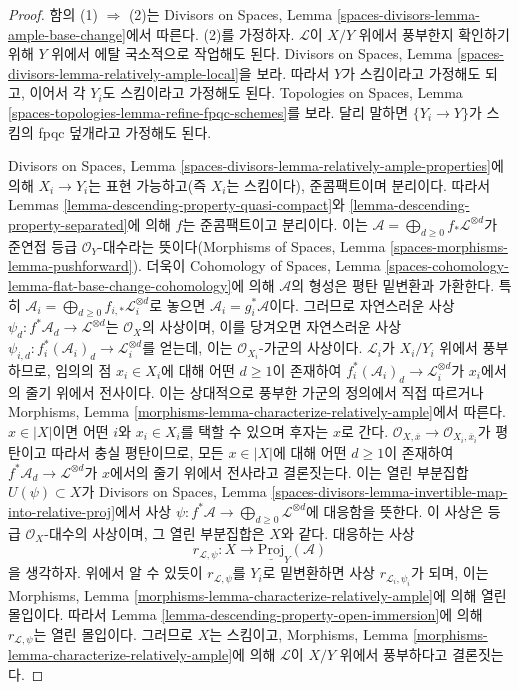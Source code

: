 \begin{proof}
함의 (1) $\Rightarrow$ (2)는 Divisors on Spaces, Lemma
\ref{spaces-divisors-lemma-ample-base-change}에서 따른다. (2)를 가정하자.
$\mathcal{L}$이 $X/Y$ 위에서 풍부한지 확인하기 위해 $Y$ 위에서 에탈
국소적으로 작업해도 된다. Divisors on Spaces, Lemma
\ref{spaces-divisors-lemma-relatively-ample-local}을 보라. 따라서 $Y$가
스킴이라고 가정해도 되고, 이어서 각 $Y_i$도 스킴이라고 가정해도 된다.
Topologies on Spaces, Lemma
\ref{spaces-topologies-lemma-refine-fpqc-schemes}를 보라. 달리 말하면
$\{Y_i\to Y\}$가 스킴의 fpqc 덮개라고 가정해도 된다.

\medskip\noindent
Divisors on Spaces, Lemma
\ref{spaces-divisors-lemma-relatively-ample-properties}에 의해
$X_i\to Y_i$는 표현 가능하고(즉 $X_i$는 스킴이다), 준콤팩트이며
분리이다. 따라서 Lemmas \ref{lemma-descending-property-quasi-compact}와
\ref{lemma-descending-property-separated}에 의해 $f$는 준콤팩트이고
분리이다. 이는
$\mathcal{A}=\bigoplus_{d\geq 0}f_*\mathcal{L}^{\otimes d}$가 준연접
등급 $\mathcal{O}_Y$-대수라는 뜻이다(Morphisms of Spaces, Lemma
\ref{spaces-morphisms-lemma-pushforward}). 더욱이 Cohomology of Spaces,
Lemma \ref{spaces-cohomology-lemma-flat-base-change-cohomology}에 의해
$\mathcal{A}$의 형성은 평탄 밑변환과 가환한다. 특히
$\mathcal{A}_i=\bigoplus_{d\geq 0}f_{i,*}\mathcal{L}_i^{\otimes d}$로 놓으면
$\mathcal{A}_i=g_i^*\mathcal{A}$이다. 그러므로 자연스러운 사상
$\psi_d:f^*\mathcal{A}_d\to\mathcal{L}^{\otimes d}$는 $\mathcal{O}_X$의
사상이며, 이를 당겨오면 자연스러운 사상
$\psi_{i,d}:f_i^*(\mathcal{A}_i)_d\to\mathcal{L}_i^{\otimes d}$를 얻는데,
이는 $\mathcal{O}_{X_i}$-가군의 사상이다.
$\mathcal{L}_i$가 $X_i/Y_i$ 위에서 풍부하므로, 임의의 점 $x_i\in X_i$에
대해 어떤 $d\geq 1$이 존재하여
$f_i^*(\mathcal{A}_i)_d\to\mathcal{L}_i^{\otimes d}$가 $x_i$에서의 줄기
위에서 전사이다. 이는 상대적으로 풍부한 가군의 정의에서 직접 따르거나
Morphisms, Lemma \ref{morphisms-lemma-characterize-relatively-ample}에서
따른다. $x\in|X|$이면 어떤 $i$와 $x_i\in X_i$를 택할 수 있으며 후자는
$x$로 간다.
$\mathcal{O}_{X,\overline{x}}\to\mathcal{O}_{X_i,\overline{x}_i}$가 평탄이고
따라서 충실 평탄이므로,
모든 $x\in|X|$에 대해 어떤 $d\geq 1$이 존재하여
$f^*\mathcal{A}_d\to\mathcal{L}^{\otimes d}$가 $x$에서의 줄기 위에서
전사라고 결론짓는다. 이는 열린 부분집합 $U(\psi)\subset X$가 Divisors
on Spaces, Lemma
\ref{spaces-divisors-lemma-invertible-map-into-relative-proj}에서 사상
$\psi:f^*\mathcal{A}\to\bigoplus_{d\geq 0}\mathcal{L}^{\otimes d}$에
대응함을 뜻한다. 이 사상은 등급 $\mathcal{O}_X$-대수의 사상이며, 그
열린 부분집합은 $X$와 같다.
대응하는 사상
$$
r_{\mathcal{L}, \psi} : X \longrightarrow \underline{\text{Proj}}_Y(\mathcal{A})
$$
을 생각하자. 위에서 알 수 있듯이 $r_{\mathcal{L},\psi}$를 $Y_i$로
밑변환하면 사상 $r_{\mathcal{L}_i,\psi_i}$가 되며, 이는 Morphisms,
Lemma \ref{morphisms-lemma-characterize-relatively-ample}에 의해 열린
몰입이다. 따라서 Lemma \ref{lemma-descending-property-open-immersion}에
의해 $r_{\mathcal{L},\psi}$는 열린 몰입이다. 그러므로 $X$는 스킴이고,
Morphisms, Lemma \ref{morphisms-lemma-characterize-relatively-ample}에 의해
$\mathcal{L}$이 $X/Y$ 위에서 풍부하다고 결론짓는다.
\end{proof}

